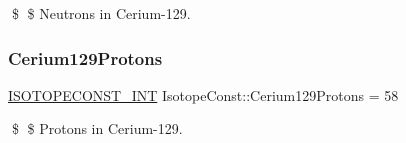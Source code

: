 \$ \$ Neutrons in Cerium-\/129. \mbox{\label{group___isotope_const-_cerium-_ce129_gaa2e6cb60ed5b2c5f39e6c04f8f272bc5}} 
\subsubsection{\texorpdfstring{Cerium129\+Protons}{Cerium129Protons}}
{\footnotesize\ttfamily \mbox{\hyperlink{group___isotope_const-_macros_ga5f18360b3e99483a35c32d789e62621c}{I\+S\+O\+T\+O\+P\+E\+C\+O\+N\+S\+T\+\_\+\+I\+NT}} Isotope\+Const\+::\+Cerium129\+Protons = 58}

\$ \$ Protons in Cerium-\/129. 